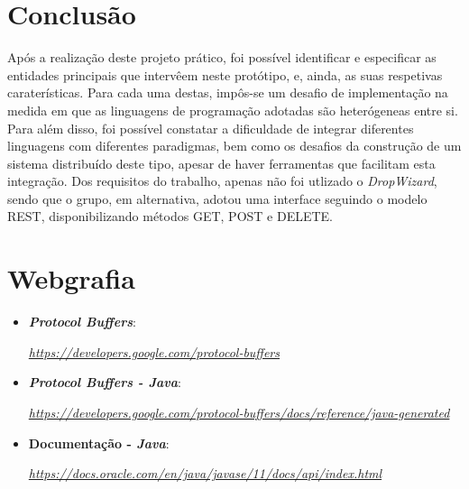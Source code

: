 \documentclass[a4paper]{report}
\begin{document}
\chapter{Conclusão}
Após a realização deste projeto prático, foi possível identificar e especificar as entidades principais que intervêem neste protótipo, e, ainda, as suas respetivas caraterísticas. Para cada uma destas, impôs-se um desafio 
de implementação na medida em que as linguagens de programação adotadas são heterógeneas entre si.
Para além disso, foi possível constatar a dificuldade de integrar diferentes linguagens com diferentes paradigmas, bem como os desafios da construção de um sistema distribuído deste tipo, apesar de haver ferramentas que facilitam esta integração.
Dos requisitos do trabalho, apenas não foi utlizado o \textit{DropWizard}, sendo que o grupo, em alternativa, adotou uma interface seguindo o modelo REST, disponibilizando métodos GET, POST e DELETE.

\chapter{Webgrafia}
	\begin{itemize}
		\item \textbf{\textit{Protocol Buffers}}:
		\par \textit{\url{https://developers.google.com/protocol-buffers}}
        \item \textbf{\textit{Protocol Buffers - Java}}:
		\par \textit{\url{https://developers.google.com/protocol-buffers/docs/reference/java-generated}}
		\item \textbf{Documentação - \textit{Java}}:
		\par \textit{\url{https://docs.oracle.com/en/java/javase/11/docs/api/index.html}}
    \end{itemize}
\end{document}
